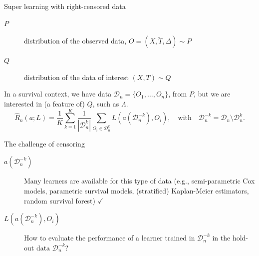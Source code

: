 \documentclass[smaller]{beamer}\usepackage{listings}
\begin{document}
\begin{frame}[label={sec:orgd5ca098}]{Super learning with right-censored data}
\small

\begin{description}
\item[{\(P\)}] distribution of the observed data, \(O = (X, \tilde T, \Delta)
  \sim P\)
\item[{\(Q\)}] distribution of the data of interest \((X, T) \sim Q\)
\end{description}

\hfill

In a survival context, we have data \(\mathcal{D}_n = \{O_1, \dots, O_n\}\),
from \(P\), but we are interested in (a feature of) \(Q\), such as
\(\Lambda\).
\begin{equation*}
  \hat{R}_n(a; L) =
  \frac{1}{K}\sum_{k=1}^{K}
  \frac{1}{| \mathcal{D}_n^{k} |}\sum_{O_i \in \mathcal{D}_n^{k}}
  L
  {
    \left(
      a{ (\mathcal{D}_n^{-k})}
      , O_i
    \right)
  },
  \quad \text{with} \quad
  \mathcal{D}_n^{-k} = \mathcal{D}_n \setminus \mathcal{D}_n^{k}.
\end{equation*}

\pause

\begin{block}{The challenge of censoring}
\begin{description}
\item[{\(a{ (\mathcal{D}_n^{-k})}\)}] Many learners are available for this type of
data (e.g., semi-parametric Cox models, parametric survival models,
(stratified) Kaplan-Meier estimators, random survival forest) \(\checkmark\)
\item[{\(L(a{ (\mathcal{D}_n^{-k})} , O_i)\)}] How to evaluate the performance of
a learner trained in \(\mathcal{D}_n^{-k}\) in the hold-out data \(\mathcal{D}_n^{-k}\)?
\end{description}
\end{block}
\end{frame}
\end{document}
